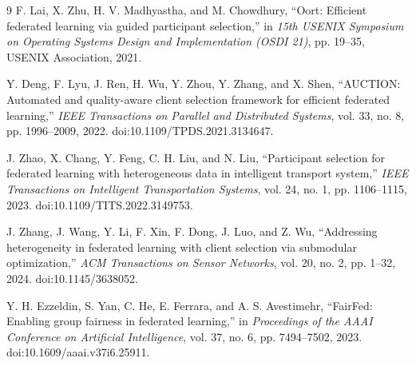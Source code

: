 \documentclass[11pt]{article}
\begin{document}
\begin{thebibliography}{9}
F. Lai, X. Zhu, H. V. Madhyastha, and M. Chowdhury,
``Oort: Efficient federated learning via guided participant selection,''
in \emph{15th USENIX Symposium on Operating Systems Design and Implementation
(OSDI 21)}, pp. 19--35, USENIX Association, 2021.

Y. Deng, F. Lyu, J. Ren, H. Wu, Y. Zhou, Y. Zhang, and X. Shen,
``AUCTION: Automated and quality-aware client selection framework for efficient federated learning,''
\emph{IEEE Transactions on Parallel and Distributed Systems}, vol. 33, no. 8,
pp. 1996--2009, 2022. doi:10.1109/TPDS.2021.3134647.

J. Zhao, X. Chang, Y. Feng, C. H. Liu, and N. Liu,
``Participant selection for federated learning with heterogeneous data in intelligent transport system,''
\emph{IEEE Transactions on Intelligent Transportation Systems}, vol. 24, no. 1,
pp. 1106--1115, 2023. doi:10.1109/TITS.2022.3149753.

J. Zhang, J. Wang, Y. Li, F. Xin, F. Dong, J. Luo, and Z. Wu,
``Addressing heterogeneity in federated learning with client selection via submodular optimization,''
\emph{ACM Transactions on Sensor Networks}, vol. 20, no. 2, pp. 1--32, 2024.
doi:10.1145/3638052.

Y. H. Ezzeldin, S. Yan, C. He, E. Ferrara, and A. S. Avestimehr,
``FairFed: Enabling group fairness in federated learning,''
in \emph{Proceedings of the AAAI Conference on Artificial Intelligence},
vol. 37, no. 6, pp. 7494--7502, 2023. doi:10.1609/aaai.v37i6.25911.

\end{thebibliography}
\end{document}
